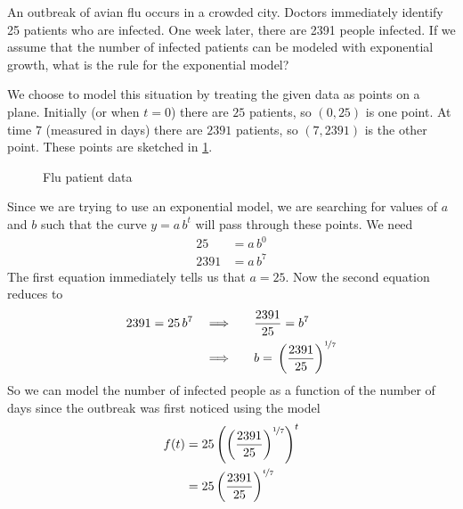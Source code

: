 \begin{pccexample}
	An outbreak of avian flu occurs in a crowded city.  Doctors immediately identify 25 patients who are infected.  
	One week later, there are 2391 people infected.  If we assume that the number of infected patients can be modeled with 
	exponential growth, what is the rule for the exponential model?
	\begin{pccsolution}
		We choose to model this situation by treating the given data as points on a plane.  Initially (or when $t=0$) there are $25$ patients, 
		so $(0,25)$ is one point.  At time $7$ (measured in days) there are $2391$ patients, so $(7,2391)$ is the other point.  
		These points are sketched in \cref{exp:fig:fludata}.
																	
		\begin{figure}[!htb]
			\centering
			\caption{Flu patient data}
			\label{exp:fig:fludata}
		\end{figure}
																	
		Since we are trying to use an exponential model, we are searching for values of $a$ and $b$ such that the curve $y=a\,b^t$ will 
		pass through these points.  We need
		\begin{align*}
			25   & =  a\,b^0   \\
			2391 & =  a\,b^{7} 
		\end{align*}
		The first equation immediately tells us that $a=25$.  Now the second equation reduces to
		\begin{alignat*}{2}
			2391 {}={}25\,b^{7} & \quad \Longrightarrow\quad &   & \frac{2391}{25}  {}={} b^7                         \\
			                    & \quad \Longrightarrow      &   & b {}={} \left(\frac{2391}{25}\right)^{\nicefrac17} 
		\end{alignat*}
		So we can model the number of infected people as a function of the number of days since the outbreak was first noticed using the model 
		\begin{align*}
			f(t) & =25\left(\left(\frac{2391}{25}\right)^{\nicefrac17}\right)^t \\
			     & =25\left(\frac{2391}{25}\right)^{\nicefrac{t}7}              
		\end{align*}
	\end{pccsolution}
										

\end{pccexample}
